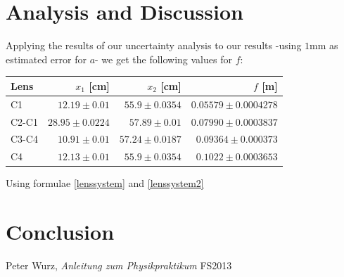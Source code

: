 \documentclass{scrreprt}
\begin{document}
\section{Analysis and Discussion}
Applying the results of our uncertainty analysis to our results -using $1$mm as estimated error for $a$- we get the following values for $f$:

\begin{table}[H]
\center
\begin{tabular}{|l|r|r|r|}
\hline
Lens & $x_1$ [cm] & $x_2$ [cm] & $f$ [m]\\
\hline
C1 &$12.19 \pm 0.01$&$55.9 \pm 0.0354$& $0.05579 \pm 0.0004278$\\
C2-C1 &$28.95 \pm 0.0224$&$57.89 \pm 0.01$& $0.07990 \pm 0.0003837$\\
C3-C4 &$10.91 \pm 0.01$&$57.24 \pm 0.0187$& $0.09364 \pm 0.000373$\\
C4 &$12.13 \pm 0.01$&$55.9 \pm 0.0354$& $0.1022 \pm 0.0003653$\\
\hline
\end{tabular}
\end{table}
Using formulae \ref{lenssystem} and \ref{lenssystem2}

\section{Conclusion}

\begin{thebibliography}{9}

  Peter Wurz,
  \emph{Anleitung zum Physikpraktikum}
  FS2013

\end{thebibliography}
\end{document}
